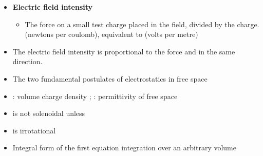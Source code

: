\begin{ELjoin}

\begin{itemize}
\tightlist
\item
  \textbf{Electric field intensity}

  \begin{itemize}
  \tightlist
  \item
    The force on a small test charge placed in the field, divided by the charge. \ELim{\ELto}  (newtons per coulomb), equivalent to  (volts per metre)
  \end{itemize}
\end{itemize}

\begin{ELdefinition}{}


\end{ELdefinition}

\end{ELjoin}

\begin{ELjoin}

\begin{itemize}
\tightlist
\item
  The electric field intensity is proportional to the force and in the same direction.
\item
  The two fundamental postulates of electrostatics in free space
\end{itemize}

\begin{ELimportant}{}


\end{ELimportant}

\end{ELjoin}

\begin{ELunit}

\begin{itemize}
\item
  \ELim{\rho}: volume charge density ; : permittivity of free space 
\item
   is not solenoidal unless 
\item
   is irrotational
\item
  Integral form of the first equation \ELim{\ELto} integration over an arbitrary volume 
\end{itemize}


\end{ELunit}

